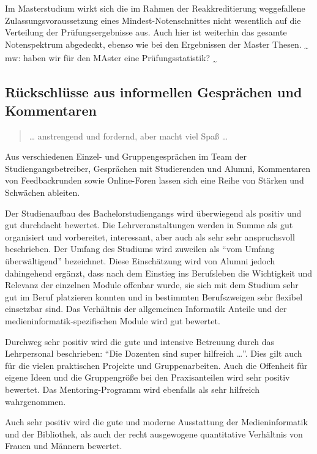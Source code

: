 Im Masterstudium wirkt sich die im Rahmen der Reakkreditierung
weggefallene Zulassungsvoraussetzung eines Mindest-Notenschnittes nicht
wesentlich auf die Verteilung der Prüfungsergebnisse aus. Auch hier ist
weiterhin das gesamte Notenspektrum abgedeckt, ebenso wie bei den
Ergebnissen der Master Thesen. \textsubscript{\textasciitilde{}} mw:
haben wir für den MAster eine Prüfungsstatistik?
\textsubscript{\textasciitilde{}}

\subsection{Rückschlüsse aus informellen Gesprächen und
Kommentaren}\label{ruxfcckschluxfcsse-aus-informellen-gespruxe4chen-und-kommentaren}

\begin{quote}
\ldots{} anstrengend und fordernd, aber macht viel Spaß \ldots{}
\end{quote}

Aus verschiedenen Einzel- und Gruppengesprächen im Team der
Studiengangsbetreiber, Gesprächen mit Studierenden und Alumni,
Kommentaren von Feedbackrunden sowie Online-Foren lassen sich eine Reihe
von Stärken und Schwächen ableiten.

Der Studienaufbau des Bachelorstudiengangs wird überwiegend als positiv
und gut durchdacht bewertet. Die Lehrveranstaltungen werden in Summe als
gut organisiert und vorbereitet, interessant, aber auch als sehr sehr
anspruchsvoll beschrieben. Der Umfang des Studiums wird zuweilen als
``vom Umfang überwältigend'' bezeichnet. Diese Einschätzung wird von
Alumni jedoch dahingehend ergänzt, dass nach dem Einstieg ins
Berufsleben die Wichtigkeit und Relevanz der einzelnen Module offenbar
wurde, sie sich mit dem Studium sehr gut im Beruf platzieren konnten und
in bestimmten Berufszweigen sehr flexibel einsetzbar sind. Das
Verhältnis der allgemeinen Informatik Anteile und der
medieninformatik-spezifischen Module wird gut bewertet.

Durchweg sehr positiv wird die gute und intensive Betreuung durch das
Lehrpersonal beschrieben: ``Die Dozenten sind super hilfreich
\ldots{}''. Dies gilt auch für die vielen praktischen Projekte und
Gruppenarbeiten. Auch die Offenheit für eigene Ideen und die
Gruppengröße bei den Praxisanteilen wird sehr positiv bewertet. Das
Mentoring-Programm wird ebenfalls als sehr hilfreich wahrgenommen.

Auch sehr positiv wird die gute und moderne Ausstattung der
Medieninformatik und der Bibliothek, als auch der recht ausgewogene
quantitative Verhältnis von Frauen und Männern bewertet.

